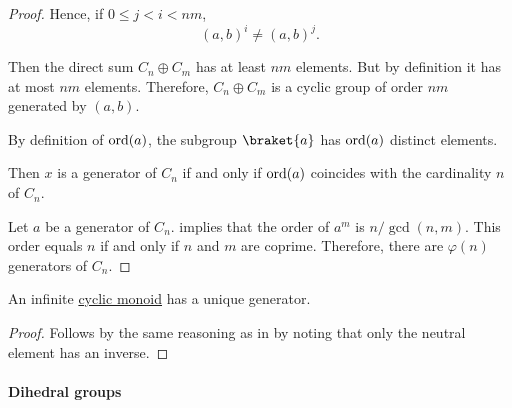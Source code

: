 \begin{proof}
  Hence, if \( 0 \leq j < i < nm \),
  \begin{equation*}
    (a, b)^i \neq (a, b)^j.
  \end{equation*}

  Then the direct sum \( C_n \oplus C_m \) has at least \( nm \) elements. But by definition it has at most \( nm \) elements. Therefore, \( C_n \oplus C_m \) is a cyclic group of order \( nm \) generated by \( (a, b) \).

   By definition of \( \operatorname{ord}(a) \), the subgroup \( \braket{ a } \) has \( \operatorname{ord}(a) \) distinct elements.

  Then \( x \) is a generator of \( C_n \) if and only if \( \operatorname{ord}(a) \) coincides with the cardinality \( n \) of \( C_n \).

   Let \( a \) be a generator of \( C_n \).  implies that the order of \( a^m \) is \( n / \gcd(n, m) \). This order equals \( n \) if and only if \( n \) and \( m \) are coprime. Therefore, there are \( \varphi(n) \) generators of \( C_n \).
\end{proof}

\begin{corollary}\label{thm:infinite_cyclic_monoid_generator}
  An infinite \hyperref[def:cyclic_monoid]{cyclic monoid} has a unique generator.
\end{corollary}
\begin{proof}
  Follows by the same reasoning as in  by noting that only the neutral element has an inverse.
\end{proof}

\paragraph{Dihedral groups}


